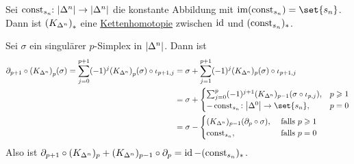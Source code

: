 \begin{lemma}[{name=[{Kettenhomotopie zwischen $\const_{s_n}$ und $\id$ auf $\abs*{\Delta^n}$}]},label=lem:136]
	Sei $\const_{s_n} \!\colon \abs*{\Delta^n} \to \abs*{\Delta^n}$ die konstante Abbildung mit $\im (\const_{s_n}) = \set{s_n} $. 
	Dann ist $\enbrace*{K_{\Delta^n}}_*$ eine \hyperref[def:76]{Kettenhomotopie} zwischen $\id$ und $(\const_{s_n})_*$.
\end{lemma}
\begin{beweis}
	Sei $\sigma$ ein singulärer $p$-Simplex in $\abs*{\Delta^n}$. Dann ist 
	\begin{align*}
		\partial_{p+1} \circ \enbrace*{K_{\Delta^n}}_p (\sigma)  = \sum_{j=0}^{p+1} (-1)^{j} \enbrace*{K_{\Delta^n}}_p(\sigma) \circ \iota_{p+1,j} &= \sigma + 
		\sum_{j=1}^{p+1} (-1)^j (K_{\Delta^n})_p(\sigma) \circ \iota_{p+1,j} \\
		&= \sigma + \begin{cases}
			\sum_{j=0}^{p} (-1)^{j+1}  (K_{\Delta^n})_{p-1} \enbrace*{\sigma \circ \iota_{p,j}} , & p \ge 1\\
			- \const_{s_n} \colon \abs*{\Delta^0} \to \set{s_n} , & p=0  
		\end{cases} \\
		&= \sigma - \begin{cases}
			(K_{\Delta^n})_{p-1} (\partial_p \circ \sigma) , &\text{ falls }p \ge 1\\
			\const_{s_n}  , &\text{ falls } p=0  
		\end{cases}
	\end{align*}
	Also ist $\partial_{p+1} \circ (K_{\Delta^n})_p + (K_{\Delta^n})_{p-1} \circ \partial_p= \id - (\const_{s_n})_*$.
\end{beweis}

